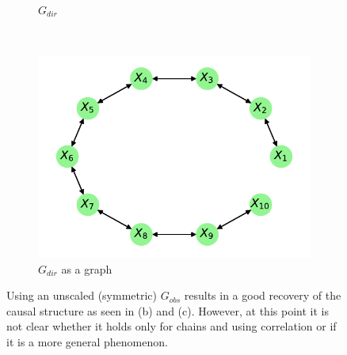\documentclass[../Thesis.tex]{subfiles}
\begin{document}
\begin{figure}[H]
\begin{subfigure}[t]{0.49\textwidth}
        \caption{$G_{dir}$}
        \label{subfig:Gaussian chain symmetric G_obs using correlation - G_dir - unscaled}
    \end{subfigure}
    \\[\baselineskip]
    \begin{subfigure}[t]{0.49\textwidth}
        \centering
        \includegraphics[width=.9\linewidth]{figures/Gaussian Chain Theoretical/Chain graph from symmetric G obs - unscaled.pdf}
        \caption{$G_{dir}$ as a graph}
    \end{subfigure}
    \caption{Using an unscaled (symmetric) $G_{obs}$ results in a good recovery of the causal structure as seen in (b) and (c). However, at this point it is not clear whether it holds only for chains and using correlation or if it is a more general phenomenon.}
    \label{fig:Gaussian chain symmetric G_obs using correlation - unscaled}
\end{figure}






\newpage

\end{document}
